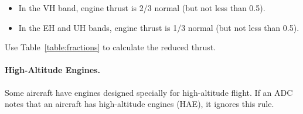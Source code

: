 \begin{advancedrules}
{\begin{itemize}

    \item In the VH band, engine thrust is 2/3 normal (but not less than 0.5).

    \item In the EH and UH bands, engine thrust is 1/3 normal (but not less than 0.5).

\end{itemize}

Use Table~\ref{table:fractions} to calculate the reduced thrust.

\paragraph{High-Altitude Engines.} Some aircraft have engines designed specially for high-altitude flight. If an ADC notes that an aircraft has high-altitude engines (HAE), it ignores this rule.
}

\end{advancedrules}
